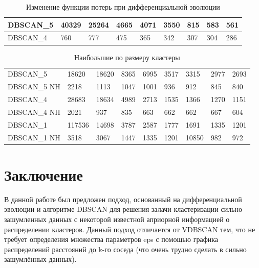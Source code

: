 \documentclass[12pt,fleqn]{article}
\begin{document}
\begin{table}[h]
\begin{center}
\begin{tabular}{|l|llllllll|}
\hline

DBSCAN\_5   & 40329 & 25264 & 4665 & 4071 & 3550 & 815 & 583 & 561\\\hline
DBSCAN\_4   & 760 & 777 &  475 & 365 & 342 & 307 & 304 & 286 \\
\hline
\end{tabular}
\caption{Изменение функции потерь при дифференциальной эволюции}\label{loss_dif}
\end{center}
\end{table}



\begin{table}[h]
\begin{center}
\begin{tabular}{|l|llllllll|}
\hline
DBSCAN\_5   & 18620 & 18620 & 8365 & 6995 & 3517 & 3315 & 2977 & 2693\\
DBSCAN\_5 NH& 2218 & 1113 & 1047 & 1001 & 936 & 912 & 845 & 840\\ \hline
DBSCAN\_4   & 28683 & 18634 &  4989 & 2713 & 1535 & 1366 & 1270 & 1151\\
DBSCAN\_4 NH& 2021 & 937 & 835 & 663 & 662 & 662 & 667 & 604\\ \hline
DBSCAN\_1   & 117536 & 14698 &  3787 & 2587 & 1777 & 1691 & 1335 & 1201\\
DBSCAN\_1 NH& 3518 & 3067 & 1447 & 1335 & 1201 & 10850 & 982 & 972\\

\hline
\end{tabular}
\caption{Наибольшие по размеру кластеры}\label{hugest_clusters}
\end{center}
\end{table}

\newpage

\section{Заключение}

В данной работе был предложен подход, основанный на дифференциальной эволюции и алгоритме DBSCAN для решения залачи кластеризации сильно зашумленных данных с некоторой известной априорной информацией о распределении кластеров. Данный подход отличается от VDBSCAN тем, что не требует определения множества параметров eps с помощью графика распределений расстояний до k-го соседа (что очень трудно сделать в сильно зашумлённых данных).
\end{document}
